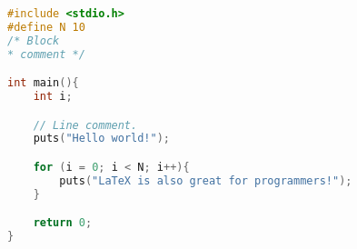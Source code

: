     \begin{lstlisting}[language=C,caption={Some C code example}]
#include <stdio.h>
#define N 10
/* Block
* comment */

int main(){
    int i;

    // Line comment.
    puts("Hello world!");

    for (i = 0; i < N; i++){
        puts("LaTeX is also great for programmers!");
    }

    return 0;
}    \end{lstlisting}


